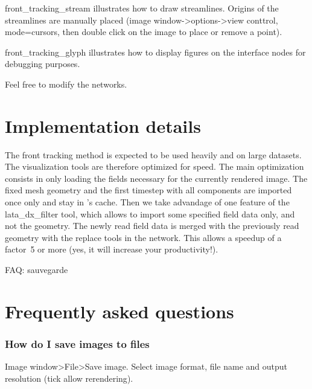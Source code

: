 \documentclass[a4paper,10pt,dvips]{article}
\begin{document}
\textsf{front\_tracking\_stream} illustrates how to draw streamlines.
Origins of the streamlines are manually placed (\textsf{image
  window->options->view conttrol}, mode=cursors, then double click on
the image to place or remove a point).

\textsf{front\_tracking\_glyph} illustrates how to display figures on
the interface nodes for debugging purposes.

Feel free to modify the networks. 

\section{Implementation details}

The front tracking method is expected to be used heavily and on large
datasets. The visualization tools are therefore optimized for speed.
The main optimization consists in only loading the fields necessary
for the currently rendered image.  The fixed mesh geometry and the
first timestep with all components are imported once only and stay in
\opendx's cache. Then we take advandage of one feature of the
lata\_dx\_filter tool, which allows to import some specified field data
only, and not the geometry. The newly read field data is merged with
the previously read geometry with the \textsf{replace} tools in the network.
This allows a speedup of a factor~5 or more (yes, it will increase your
productivity!).

FAQ: sauvegarde
\section{Frequently asked questions}
\subsubsection{How do I save images to files}
\textsf{Image window>File>Save image}. Select image format, file name
and output resolution (tick \textsf{allow rerendering}).
\end{document}
